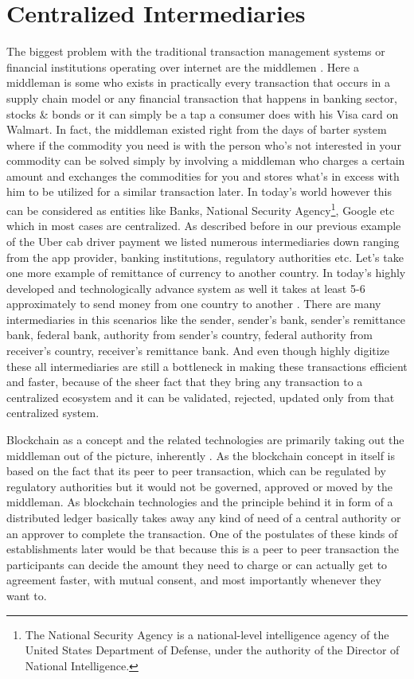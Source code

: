 \section{Centralized Intermediaries}
The biggest problem with the traditional transaction management systems or financial institutions operating over internet are the middlemen \cite{torres10}. Here a middleman is some who exists in practically every transaction that occurs in a supply chain model or any financial transaction that happens in banking sector, stocks \& bonds or it can simply be a tap a consumer does with his Visa card on Walmart. In fact, the middleman existed right from the days of barter system where if the commodity you need is with the person who's not interested in your commodity can be solved simply by involving a middleman who charges a certain amount and exchanges the commodities for you and stores what's in excess with him to be utilized for a similar transaction later. In today's world however this can be considered as entities like Banks, National Security Agency\footnote{The National Security Agency is a national-level intelligence agency of the United States Department of Defense, under the authority of the Director of National Intelligence.}, Google etc which in most cases are centralized. As described before in our previous example of the Uber cab driver payment we listed numerous intermediaries down ranging from the app provider, banking institutions, regulatory authorities etc. Let's take one more example of remittance of currency to another country. In today's highly developed and technologically advance system as well it takes at least 5-6 approximately to send money from one country to another \cite{martinez11}. There are many intermediaries in this scenarios like the sender, sender's bank, sender's remittance bank, federal bank, authority from sender's country, federal authority from receiver's country, receiver's remittance bank. And even though highly digitize these all intermediaries are still a bottleneck in making these transactions efficient and faster, because of the sheer fact that they bring any transaction to a centralized ecosystem and it can be validated, rejected, updated only from that centralized system.

Blockchain as a concept and the related technologies are primarily taking out the middleman out of the picture, inherently \cite{lloyd4}. As the blockchain concept in itself is based on the fact that its peer to peer transaction, which can be regulated by regulatory authorities but it would not be governed, approved or moved by the middleman. As blockchain technologies and the principle behind it in form of a distributed ledger basically takes away any kind of need of a central authority or an approver to complete the transaction. One of the postulates of these kinds of establishments later would be that because this is a peer to peer transaction the participants can decide the amount they need to charge or can actually get to agreement faster, with mutual consent, and most importantly whenever they want to.

